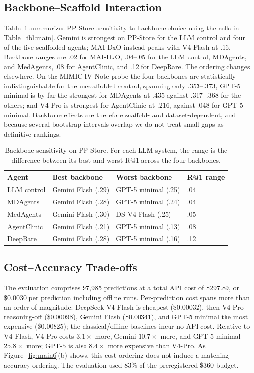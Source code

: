 \subsection{Backbone--Scaffold Interaction}
\label{sec-6-2}

Table~\ref{tbl:bbsens} summarizes PP-Store sensitivity to backbone choice using the cells in Table~\ref{tbl:main}. Gemini is strongest on PP-Store for the LLM control and four of the five scaffolded agents; MAI-DxO instead peaks with V4-Flash at .16. Backbone ranges are .02 for MAI-DxO, .04--.05 for the LLM control, MDAgents, and MedAgents, .08 for AgentClinic, and .12 for DeepRare. The ordering changes elsewhere. On the MIMIC-IV-Note probe the four backbones are statistically indistinguishable for the unscaffolded control, spanning only .353--.373; GPT-5 minimal is by far the strongest for MDAgents at .435 against .317--.368 for the others; and V4-Pro is strongest for AgentClinic at .216, against .048 for GPT-5 minimal. Backbone effects are therefore scaffold- and dataset-dependent, and because several bootstrap intervals overlap we do not treat small gaps as definitive rankings.

\begin{table}[t]
\centering
\scriptsize
\setlength{\tabcolsep}{8pt}
\caption{Backbone sensitivity on PP-Store. For each LLM system, the range is
the difference between its best and worst R@1 across the four backbones.}
\label{tbl:bbsens}
\begin{tabular}{@{}llll@{}}
\toprule
Agent & Best backbone & Worst backbone & R@1 range \\
\midrule
LLM control & Gemini Flash (.29) & GPT-5 minimal (.25) & .04 \\
MDAgents & Gemini Flash (.28) & GPT-5 minimal (.24) & .04 \\
MedAgents & Gemini Flash (.30) & DS V4-Flash (.25) & .05 \\
AgentClinic & Gemini Flash (.21) & GPT-5 minimal (.13) & .08 \\
DeepRare & Gemini Flash (.28) & GPT-5 minimal (.16) & .12 \\
\bottomrule
\end{tabular}
\end{table}


\subsection{Cost--Accuracy Trade-offs}
\label{sec-6-3}

The evaluation comprises 97,985 predictions at a total API cost of \$297.89, or \$0.0030 per prediction including offline runs. Per-prediction cost spans more than an order of magnitude: DeepSeek V4-Flash is cheapest (\$0.00032), then V4-Pro reasoning-off (\$0.00098), Gemini Flash (\$0.00341), and GPT-5 minimal the most expensive (\$0.00825); the classical/offline baselines incur no API cost. Relative to V4-Flash, V4-Pro costs $3.1\times$ more, Gemini $10.7\times$ more, and GPT-5 minimal $25.8\times$ more; GPT-5 is also $8.4\times$ more expensive than V4-Pro. As Figure~\ref{fig:main6}(b) shows, this cost ordering does not induce a matching accuracy ordering. The evaluation used 83\% of the preregistered \$360 budget.

